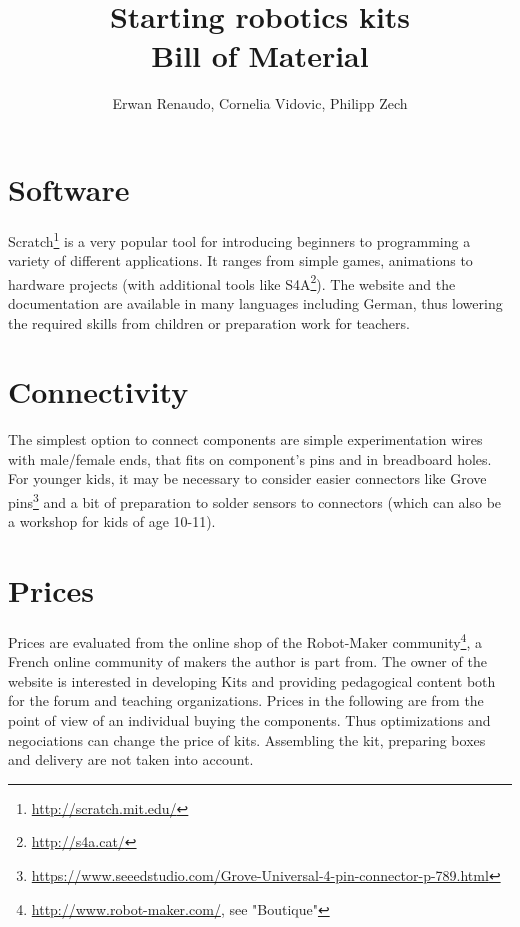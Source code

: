 \documentclass{article}
\title{Starting robotics kits\\Bill of Material}
\author{Erwan Renaudo, Cornelia Vidovic, Philipp Zech}
\begin{document}
\maketitle
 
\section{Software}

    Scratch\footnote{\href{http://scratch.mit.edu/}{http://scratch.mit.edu/}} is a very popular tool for introducing beginners to programming a variety of different applications. It ranges from simple games, animations to hardware projects (with additional tools like S4A\footnote{\href{http://s4a.cat/}{http://s4a.cat/}}). The website and the documentation are available in many languages including German, thus lowering the required skills from children or preparation work for teachers.

\section{Connectivity}

    The simplest option to connect components are simple experimentation wires with male/female ends, that fits on component's pins and in breadboard holes. For younger kids, it may be necessary to consider easier connectors like Grove pins\footnote{\href{https://www.seeedstudio.com/Grove-Universal-4-pin-connector-p-789.html}{https://www.seeedstudio.com/Grove-Universal-4-pin-connector-p-789.html}} and a bit of preparation to solder sensors to connectors (which can also be a workshop for kids of age 10-11).

\section{Prices}

    Prices are evaluated from the online shop of the Robot-Maker community\footnote{\href{http://www.robot-maker.com/}{http://www.robot-maker.com/}, see "Boutique"}, a French online community of makers the author is part from. The owner of the website is interested in developing Kits and providing pedagogical content both for the forum and teaching organizations. Prices in the following are from the point of view of an individual buying the components. Thus optimizations and negociations can change the price of kits. Assembling the kit, preparing boxes and delivery are not taken into account.
\end{document}
